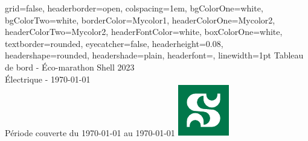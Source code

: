 \documentclass[a0paper,portrait]{baposter}
\begin{document}

\begin{poster}
{
grid=false,
headerborder=open, %
colspacing=1em, %
bgColorOne=white, %
bgColorTwo=white, %
borderColor=Mycolor1, %
headerColorOne=Mycolor2, %
headerColorTwo=Mycolor2, %
headerFontColor=white, %
boxColorOne=white, %
textborder=rounded, %
eyecatcher=false, %
headerheight=0.08\textheight, %
headershape=rounded, %
headershade=plain,
headerfont=\Large\textsf, %
linewidth=1pt %
}
{}
%
%
{\textsf{{Tableau de bord - Éco-marathon Shell 2023}}} %
{\sf\vspace{0.1em}\\
Électrique  -  {\AdvanceDate[0]\today} 
\vspace{0.1em}\\
\small{ Période couverte du {\AdvanceDate[-7]\today} au {\AdvanceDate[0]\today}
}
}
{\includegraphics[width=.1\linewidth]{img/udes.pdf}} %

\end{poster}
\end{document}
